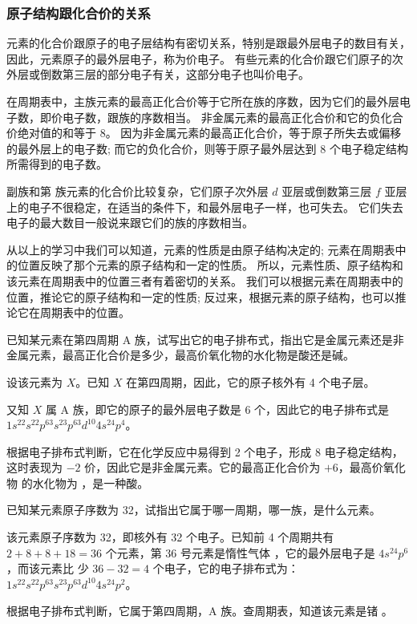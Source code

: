 \subsubsection{原子结构跟化合价的关系}
元素的化合价跟原子的电子层结构有密切关系，特别是跟最外层电子的数目有关，因此，元素原子的最外层电子，称为价电子。
有些元素的化合价跟它们原子的次外层或倒数第三层的部分电子有关，这部分电子也叫价电子。

在周期表中，主族元素的最高正化合价等于它所在族的序数，因为它们的最外层电子数，即价电子数，跟族的序数相当。
非金属元素的最高正化合价和它的负化合价绝对值的和等于 8。
因为非金属元素的最高正化合价，等于原子所失去或偏移的最外层上的电子数; 而它的负化合价，则等于原子最外层达到 8 个电子稳定结构所需得到的电子数。

副族和第  族元素的化合价比较复杂，它们原子次外层 $d$ 亚层或倒数第三层 $f$ 亚层上的电子不很稳定，在适当的条件下，和最外层电子一样，也可失去。
它们失去电子的最大数目一般说来跟它们的族的序数相当。

从以上的学习中我们可以知道，元素的性质是由原子结构决定的; 元素在周期表中的位置反映了那个元素的原子结构和一定的性质。
所以，元素性质、原子结构和该元素在周期表中的位置三者有着密切的关系。
我们可以根据元素在周期表中的位置，推论它的原子结构和一定的性质; 反过来，根据元素的原子结构，也可以推论它在周期表中的位置。

\begin{example}
  已知某元素在第四周期 A 族，试写出它的电子排布式，指出它是金属元素还是非金属元素，最高正化合价是多少，最高价氧化物的水化物是酸还是碱。
\end{example}
\begin{solution}
设该元素为 $X$。已知 $X$ 在第四周期，因此，它的原子核外有 4 个电子层。

又知 $X$ 属 A 族，即它的原子的最外层电子数是 6 个，因此它的电子排布式是 $1s^22s^22p^63s^23p^63d^{10}4s^24p^4$。

根据电子排布式判断，它在化学反应中易得到 2 个电子，形成 8 电子稳定结构，这时表现为 $-2$ 价，因此它是非金属元素。它的最高正化合价为 $+6$，最高价氧化物  的水化物为 ，是一种酸。
\end{solution}

\begin{example}
已知某元素原子序数为 32，试指出它属于哪一周期，哪一族，是什么元素。
\end{example}
\begin{solution}
  该元素原子序数为 32，即核外有 32 个电子。已知前 4 个周期共有 $2+8+8+18=36$ 个元素，第 36 号元素是惰性气体 ，它的最外层电子是 $4s^24p^6$，而该元素比   少 $36-32=4$ 个电子，它的电子排布式为：$1s^22s^22p^63s^23p^63d^{10}4s^24p^2$。
  
根据电子排布式判断，它属于第四周期，A 族。查周期表，知道该元素是锗 。
\end{solution}

